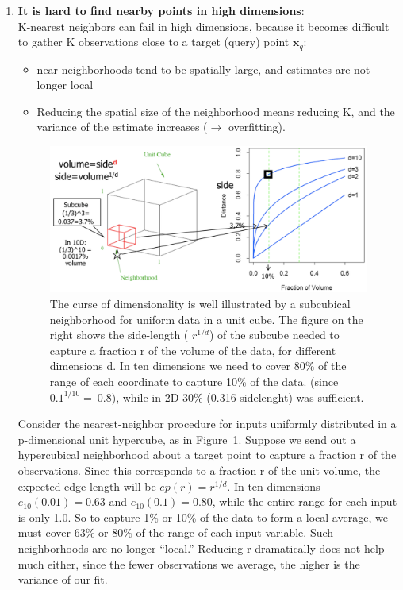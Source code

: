 \documentclass[../main.tex]{subfiles}
\begin{document}
\begin{enumerate}
    \item \textbf{It is hard to find nearby points in high dimensions}:\\
    K-nearest neighbors can fail in high dimensions, because it becomes difficult to gather K observations close to a target (query) point $\mathbf{x}_q$: 
    \begin{itemize}
        \item near neighborhoods tend to be spatially large, and estimates are not longer local
        \item Reducing the spatial size of the neighborhood means reducing K, and the variance of the estimate increases ($\rightarrow$ overfitting).
    \end{itemize}
    
    \begin{figure}
        \centering
        \includegraphics[scale = 0.2]{lectures/3_K_nn/3_curse_of_dim_hypercube.png}
        \caption{The curse of dimensionality is well illustrated by a subcubical neighborhood for uniform data in a unit cube. The figure on the right shows the side-length ( $r^{1/d}$) of the subcube needed to capture a fraction r of the volume of the data, for different dimensions d. In ten dimensions we need to cover 80\% of the range of each coordinate to capture 10\% of the data. (since $0.1^{1/10}=~ 0.8$), while in 2D 30\% (0.316 sidelenght) was sufficient.}
        \label{fig:3_curse_of_dim_hypercube}
    \end{figure}
    Consider the nearest-neighbor procedure for inputs uniformly distributed in a p-dimensional unit hypercube, as in Figure~\ref{fig:3_curse_of_dim_hypercube}. Suppose we send out a hypercubical neighborhood about a target point to capture a fraction r of the observations. Since this corresponds to a fraction r of the unit volume, the expected edge length will be $ep(r) = r^{1/d}$. In ten dimensions $e_{10}(0.01) = 0.63$ and $e_{10}(0.1) = 0.80$, while the entire range for each input is only 1.0. So to capture 1\% or 10\% of the data to form a local average, we must cover 63\% or 80\% of the range of each input variable. Such neighborhoods are no longer “local.” Reducing r dramatically does not help much either, since the fewer observations we average, the higher is the variance of our fit.\\
    

\end{enumerate}
\end{document}
